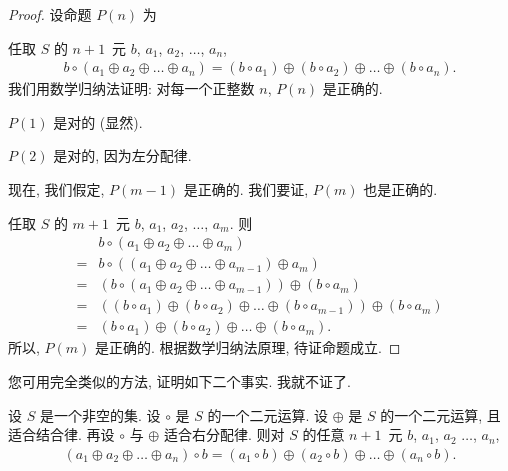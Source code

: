 \documentclass[%
    UTF8,%
    fontset=none,%
    punct=kaiming,%
    zihao=-4,%
    a4paper,%
    oneside,%
]{ctexbook}
\makeatletter
\renewenvironment{quotation}
{\list{}{\listparindent 2\ccwd%
\itemindent\listparindent
\leftmargin\rightmargin
\parsep\z@ \@plus\p@}%
\item\relax}
{\endlist}
\makeatother
\begin{document}
\begin{proof}
    设命题 \(P(n)\) 为
    \begin{quotation}
        任取 \(S\) 的 \(n + 1\)~元
        \(b\), \(a_1\), \(a_2\), \(\dots\), \(a_n\),
        \begin{align*}
            b \circ (a_1 \oplus a_2 \oplus \dots \oplus a_n)
            =
            (b \circ a_1) \oplus (b \circ a_2) \oplus
            \dots     \oplus (b \circ a_n).
        \end{align*}
    \end{quotation}
    我们用数学归纳法证明:
    对每一个正整数 \(n\), \(P(n)\) 是正确的.

    \(P(1)\) 是对的 (显然).

    \(P(2)\) 是对的, 因为左分配律.

    现在, 我们假定, \(P(m-1)\) 是正确的.
    我们要证, \(P(m)\) 也是正确的.

    任取 \(S\) 的 \(m + 1\)~元
    \(b\), \(a_1\), \(a_2\), \(\dots\), \(a_m\).
    则
    \begin{align*}
             &
        b \circ (a_1 \oplus a_2 \oplus \dots \oplus a_m)
        \\
        = {} &
        b \circ ((a_1 \oplus a_2 \oplus \dots \oplus a_{m-1})
        \oplus a_m)
        \\
        = {} &
        (b \circ (a_1 \oplus a_2 \oplus \dots \oplus a_{m-1}))
        \oplus (b \circ a_m)
        \\
        = {} &
        ((b \circ a_1) \oplus (b \circ a_2) \oplus
        \dots \oplus (b \circ a_{m-1}))
        \oplus (b \circ a_m)
        \\
        = {} &
        (b \circ a_1) \oplus (b \circ a_2) \oplus
        \dots \oplus (b \circ a_m).
    \end{align*}
    所以, \(P(m)\) 是正确的.
    根据数学归纳法原理, 待证命题成立.
\end{proof}

您可用完全类似的方法, 证明如下二个事实.
我就不证了.

\begin{theorem}
    设 \(S\) 是一个非空的集.
    设 \(\circ\) 是 \(S\) 的一个二元运算.
    设 \(\oplus\) 是 \(S\) 的一个二元运算,
    且适合结合律.
    再设 \(\circ\) 与 \(\oplus\) 适合右分配律.
    则对 \(S\) 的任意 \(n + 1\)~元
    \(b\), \(a_1\), \(a_2\) \(\dots\), \(a_n\),
    \begin{align*}
        (a_1 \oplus a_2 \oplus \dots \oplus a_n) \circ b
        =
        (a_1 \circ b) \oplus (a_2 \circ b) \oplus
        \dots \oplus (a_n \circ b).
    \end{align*}
\end{theorem}
\end{document}
